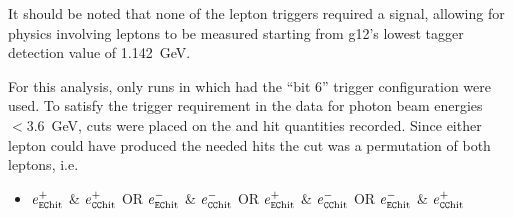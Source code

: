 It should be noted that none of the lepton triggers required a  signal, allowing for physics involving leptons to be measured starting from g12's lowest tagger detection value of 1.142~GeV.

For this analysis, only runs in which had the ``bit 6'' trigger configuration were used. To satisfy the trigger requirement in the data for photon beam energies $<3.6$~GeV, cuts were placed on the  and  hit quantities recorded. Since either lepton could have produced the needed hits the cut was a permutation of both leptons, i.e.
\begin{itemize}
	\item $e^+_\mathrm{\textsc{\texttt{EC}}hit}$ \& $e^+_\mathrm{\textsc{\texttt{CC}}hit}$ OR $e^-_\mathrm{\textsc{\texttt{EC}}hit}$ \& $e^-_\mathrm{\textsc{\texttt{CC}}hit}$ OR $e^+_\mathrm{\textsc{\texttt{EC}}hit}$ \& $e^-_\mathrm{\textsc{\texttt{CC}}hit}$ OR $e^-_\mathrm{\textsc{\texttt{EC}}hit}$ \& $e^+_\mathrm{\textsc{\texttt{CC}}hit}$
\end{itemize}


\FloatBarrier
